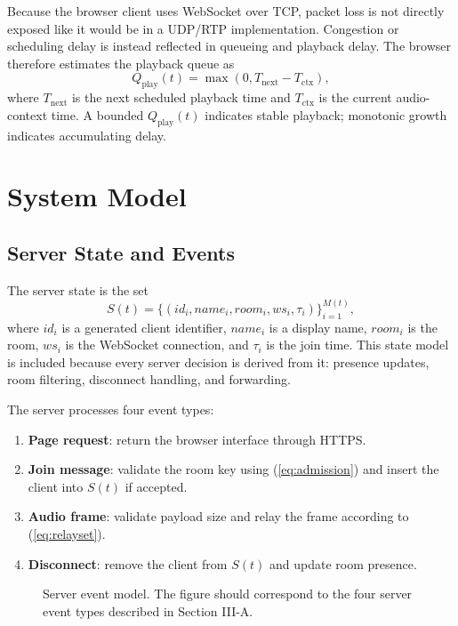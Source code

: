 \documentclass[conference]{IEEEtran}
\begin{document}
Because the browser client uses WebSocket over TCP, packet loss is not directly exposed like it would be in a UDP/RTP implementation. Congestion or scheduling delay is instead reflected in queueing and playback delay. The browser therefore estimates the playback queue as
\begin{equation}
    Q_{\mathrm{play}}(t) =
    \max(0,T_{\mathrm{next}}-T_{\mathrm{ctx}}),
    \label{eq:qplay}
\end{equation}
where $T_{\mathrm{next}}$ is the next scheduled playback time and $T_{\mathrm{ctx}}$ is the current audio-context time. A bounded $Q_{\mathrm{play}}(t)$ indicates stable playback; monotonic growth indicates accumulating delay.

\section{System Model}

\subsection{Server State and Events}

The server state is the set
\begin{equation}
    S(t)=\{(id_i,name_i,room_i,ws_i,\tau_i)\}_{i=1}^{M(t)},
    \label{eq:serverstate}
\end{equation}
where $id_i$ is a generated client identifier, $name_i$ is a display name, $room_i$ is the room, $ws_i$ is the WebSocket connection, and $\tau_i$ is the join time. This state model is included because every server decision is derived from it: presence updates, room filtering, disconnect handling, and forwarding.

The server processes four event types:
\begin{enumerate}
    \item \textbf{Page request}: return the browser interface through HTTPS.
    \item \textbf{Join message}: validate the room key using (\ref{eq:admission}) and insert the client into $S(t)$ if accepted.
    \item \textbf{Audio frame}: validate payload size and relay the frame according to (\ref{eq:relayset}).
    \item \textbf{Disconnect}: remove the client from $S(t)$ and update room presence.
\end{enumerate}

\begin{figure}[t]
    \centering
    \caption{Server event model. The figure should correspond to the four server event types described in Section III-A.}
    \label{fig:serverevents}
\end{figure}
\end{document}

